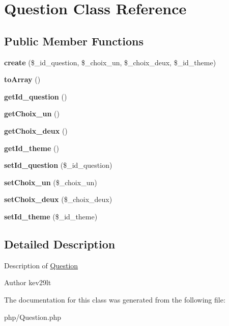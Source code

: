 \hypertarget{class_question}{}\section{Question Class Reference}
\label{class_question}
\subsection*{Public Member Functions}
\begin{DoxyCompactItemize}
\item 
\mbox{\label{class_question_ad6dc06c16568a91a325130bb376c0a64}} 
{\bfseries create} (\$\+\_\+id\+\_\+question, \$\+\_\+choix\+\_\+un, \$\+\_\+choix\+\_\+deux, \$\+\_\+id\+\_\+theme)
\item 
\mbox{\label{class_question_a658defb34762c8f40085aec87e16ba1a}} 
{\bfseries to\+Array} ()
\item 
\mbox{\label{class_question_a1fbf0c8124cfe5071f083c38d0494acb}} 
{\bfseries get\+Id\+\_\+question} ()
\item 
\mbox{\label{class_question_a056ee70acc67ac31b40cc34e7fc49160}} 
{\bfseries get\+Choix\+\_\+un} ()
\item 
\mbox{\label{class_question_a22c9113b05a57fb63dd4384773645164}} 
{\bfseries get\+Choix\+\_\+deux} ()
\item 
\mbox{\label{class_question_aa6130b6e2174952ddab6a82945b4cc94}} 
{\bfseries get\+Id\+\_\+theme} ()
\item 
\mbox{\label{class_question_ac24eebef0d2ff0f8671de8c88136c189}} 
{\bfseries set\+Id\+\_\+question} (\$\+\_\+id\+\_\+question)
\item 
\mbox{\label{class_question_a91cf7747be8134f6cc146c5f1caeeaca}} 
{\bfseries set\+Choix\+\_\+un} (\$\+\_\+choix\+\_\+un)
\item 
\mbox{\label{class_question_ab89c17ce6bf425920134cefee8bbb18d}} 
{\bfseries set\+Choix\+\_\+deux} (\$\+\_\+choix\+\_\+deux)
\item 
\mbox{\label{class_question_ace5c32652a4480e28814b02809505c3d}} 
{\bfseries set\+Id\+\_\+theme} (\$\+\_\+id\+\_\+theme)
\end{DoxyCompactItemize}


\subsection{Detailed Description}
Description of \mbox{\hyperlink{class_question}{Question}}

\begin{DoxyAuthor}{Author}
kev29lt 
\end{DoxyAuthor}


The documentation for this class was generated from the following file\+:\begin{DoxyCompactItemize}
\item 
php/Question.\+php\end{DoxyCompactItemize}
